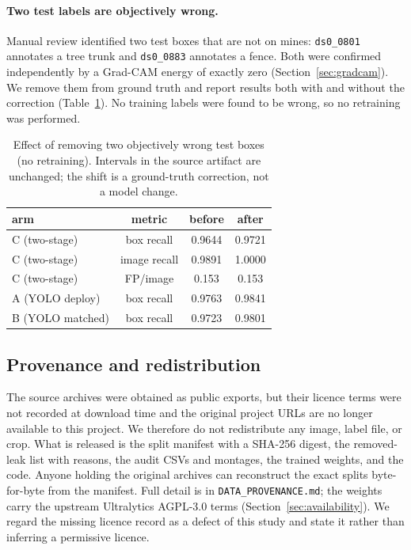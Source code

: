 \paragraph{Two test labels are objectively wrong.} Manual review identified two
test boxes that are not on mines: \texttt{ds0\_0801} annotates a tree trunk and
\texttt{ds0\_0883} annotates a fence. Both were confirmed independently by a
Grad-CAM energy of exactly zero (Section~\ref{sec:gradcam}). We remove them from
ground truth and report results both with and without the correction
(Table~\ref{tab:labelfix}). No training labels were found to be wrong, so no
retraining was performed.

\begin{table}[t]
\centering
\small
\caption{Effect of removing two objectively wrong test boxes (no retraining).
Intervals in the source artifact are unchanged; the shift is a ground-truth
correction, not a model change.}
\label{tab:labelfix}
\begin{tabular}{lccc}
\toprule
arm & metric & before & after \\
\midrule
C (two-stage) & box recall & 0.9644 & 0.9721 \\
C (two-stage) & image recall & 0.9891 & 1.0000 \\
C (two-stage) & FP/image & 0.153 & 0.153 \\
A (YOLO deploy) & box recall & 0.9763 & 0.9841 \\
B (YOLO matched) & box recall & 0.9723 & 0.9801 \\
\bottomrule
\end{tabular}
\end{table}

\subsection{Provenance and redistribution}

The source archives were obtained as public exports, but their licence terms were
not recorded at download time and the original project URLs are no longer
available to this project. We therefore do not redistribute any image, label file,
or crop. What is released is the split manifest with a SHA-256 digest, the
removed-leak list with reasons, the audit CSVs and montages, the trained weights,
and the code. Anyone holding the original archives can reconstruct the exact
splits byte-for-byte from the manifest. Full detail is in
\texttt{DATA\_PROVENANCE.md}; the weights carry the upstream Ultralytics AGPL-3.0
terms (Section~\ref{sec:availability}). We regard the missing licence record as a
defect of this study and state it rather than inferring a permissive licence.
